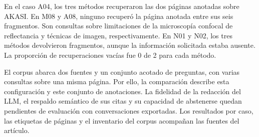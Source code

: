 En el caso A04, los tres métodos recuperaron las dos páginas anotadas sobre AKASI. En M08 y A08, ninguno recuperó la página anotada entre sus seis fragmentos. Son consultas sobre limitaciones de la microscopía confocal de reflectancia y técnicas de imagen, respectivamente. En N01 y N02, los tres métodos devolvieron fragmentos, aunque la información solicitada estaba ausente. La proporción de recuperaciones vacías fue 0 de 2 para cada método.

El corpus abarca dos fuentes y un conjunto acotado de preguntas, con varias consultas sobre una misma página. Por ello, la comparación describe esta configuración y este conjunto de anotaciones. La fidelidad de la redacción del LLM, el respaldo semántico de sus citas y su capacidad de abstenerse quedan pendientes de evaluación con conversaciones exportadas. Los resultados por caso, las etiquetas de páginas y el inventario del corpus acompañan las fuentes del artículo.
